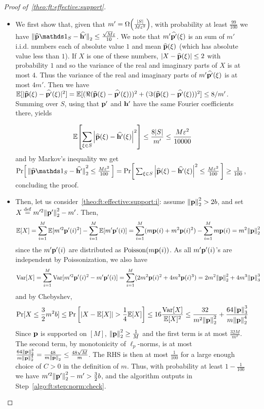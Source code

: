 \begin{proof}[Proof of~\cref{theo:ft:effective:support}]
\begin{itemize}
  \item We first show that, given that $m'=\bigOmega{\frac{\abs{S}}{M\eps^2}}$, with probability at least $\frac{99}{100}$ we have
    $
        \normtwo{\fourier{\q}\indicSet{S}-\fourier{\h'}} \leq \frac{\sqrt{M}\eps}{10}
    $.
	We note that $m'\widehat{\mathbf{p}'}(\xi)$ is an sum of $m'$ i.i.d. numbers each of absolute value $1$ and mean $\widehat{\mathbf{p}}(\xi)$ (which has absolute value less than $1$). If $X$ is one of these numbers, $|X-\widehat{\mathbf{p}}(\xi)| \leq 2$ with probability $1$ and so the variance of the real and imaginary parts of $X$ is at most $4$. Thus the variance of the real and imaginary  parts of $m'\widehat{\mathbf{p}'}(\xi)$ is at most $4m'$. Then we have
	$\mathbb{E}[|\widehat{\mathbf{p}}(\xi) - \widehat{\mathbf{p}'}(\xi)|^2]=\mathbb{E}[ (\Re (\widehat{\mathbf{p}}(\xi) - \widehat{\mathbf{p}'}(\xi)))^2 + (\Im ( \widehat{\mathbf{p}}(\xi) - \widehat{\mathbf{p}'}(\xi)))^2] \leq 8/m'$. Summing over $S$, using that $\mathbf{p}'$ and $\mathbf{h}'$ have the same Fourier coefficients there, yields
	
\[
    \mathbb{E}\!\left[ \sum_{\xi\in S} \left\lvert \widehat{\mathbf{p}}(\xi)-\widehat{\mathbf{h}'}(\xi) \right\rvert^2 \right] \leq \frac{8|S|}{m'} \leq \frac{M\varepsilon^2}{10000}
\]
and by Markov's inequality we get 
$\probaOf{ \normtwo{\fourier{\q}\indicSet{S}-\fourier{\h'}}^2 \leq \frac{M\eps^2}{100} } = \probaOf{ \sum_{\xi\in S} \abs{\fourier{\q}(\xi)-\fourier{\h'}(\xi)}^2 \leq \frac{M\eps^2}{100} } \geq \frac{1}{100}$,
 concluding the proof.


  \item Then, let us consider~\cref{theo:ft:effective:support:i}: assume ${\lVert\mathbf{p}{\rVert}}_2^2 > 2b$, and set $X\stackrel{\rm def}{=} m'^2{\lVert\mathbf{p}'{\rVert}}_2^2 - m'$. Then, 
\[
  \mathbb{E}[ X ] = \sum_{i=1}^M \mathbb{E}[ m'^2\mathbf{p}'(i)^2 ] - \sum_{i=1}^M \mathbb{E}[ m'\mathbf{p}'(i) ] = \sum_{i=1}^M ( m\mathbf{p}(i)+m^2\mathbf{p}(i)^2) - \sum_{i=1}^M m\mathbf{p}(i)= m^2{\lVert\mathbf{p}{\rVert}}_2^2
\]
since the $m'\mathbf{p}'(i)$ are distributed as $\operatorname{Poisson}\!\left( m\mathbf{p}(i) \right) $. As all $m'\mathbf{p}'(i)$'s are independent by Poissonization, we also have
\[
  \operatorname{Var}[ X ] = \sum_{i=1}^M \operatorname{Var}[ m'^2\mathbf{p}'(i)^2 - m'\mathbf{p}'(i) ] = \sum_{i=1}^M ( 2m^2\mathbf{p}(i)^2 + 4m^3\mathbf{p}(i)^3) 
  = 2m^2 {\lVert\mathbf{p}{\rVert}}_2^2 + 4m^3 \lVert\mathbf{p}{\rVert}_3^3
\]
and by Chebyshev,
\[
    \Pr[ X \leq \frac{3}{2}m^2b] \leq \Pr\left[ \left\lvert  X - \mathbb{E}[ X ]  \right\rvert > \frac{1}{4} \mathbb{E}[ X ] \right]
    \leq 16\frac{\operatorname{Var}[ X ]}{\mathbb{E}[ X ]^2}
    \leq \frac{32}{m^2{\lVert\mathbf{p}{\rVert}}_2^2} + \frac{64 \lVert\mathbf{p}{\rVert}_3^3}{m {\lVert\mathbf{p}{\rVert}}_2^4 }
\]
Since $\mathbf{p}$ is supported on $[M]$, ${\lVert\mathbf{p}{\rVert}}_2^2 \geq \frac{1}{M}$ and the first term is at most $\frac{32M}{m^2}$. The second term, by monotonicity of $\ell_p$-norms, is at most 
$\frac{64 {\lVert\mathbf{p}{\rVert}}_2^3}{m {\lVert\mathbf{p}{\rVert}}_2^4 } = \frac{48}{m {\lVert\mathbf{p}{\rVert}}_2 } \leq \frac{48\sqrt{M}}{m}$. The RHS is then at most $\frac{1}{100}$ for a large enough choice of $C>0$ in the definition of $m$. Thus, with probability at least $1-\frac{1}{100}$ we have $m'^2{\lVert\mathbf{p}'{\rVert}}_2^2 - m' > \frac{3}{2}b$, and the algorithm outputs \reject in Step~\ref{algo:ft:step:norm:check}.


\end{itemize}
\end{proof}
